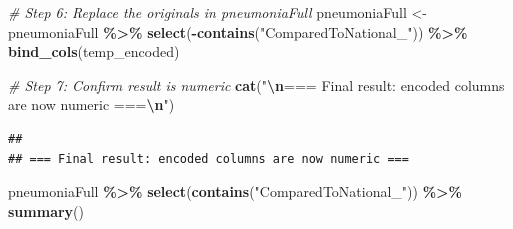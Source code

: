 \documentclass[
]{article}
\newenvironment{Shaded}{\begin{snugshade}}{\end{snugshade}}
\newcommand{\CommentTok}[1]{\textcolor[rgb]{0.56,0.35,0.01}{\textit{#1}}}
\newcommand{\FunctionTok}[1]{\textcolor[rgb]{0.13,0.29,0.53}{\textbf{#1}}}
\newcommand{\NormalTok}[1]{#1}
\newcommand{\OtherTok}[1]{\textcolor[rgb]{0.56,0.35,0.01}{#1}}
\newcommand{\SpecialCharTok}[1]{\textcolor[rgb]{0.81,0.36,0.00}{\textbf{#1}}}
\newcommand{\StringTok}[1]{\textcolor[rgb]{0.31,0.60,0.02}{#1}}
\begin{document}
\begin{Shaded}
\begin{Highlighting}[]
\CommentTok{\# Step 6: Replace the originals in pneumoniaFull}
\NormalTok{pneumoniaFull }\OtherTok{\textless{}{-}}\NormalTok{ pneumoniaFull }\SpecialCharTok{\%\textgreater{}\%}
    \FunctionTok{select}\NormalTok{(}\SpecialCharTok{{-}}\FunctionTok{contains}\NormalTok{(}\StringTok{"ComparedToNational\_"}\NormalTok{)) }\SpecialCharTok{\%\textgreater{}\%}
    \FunctionTok{bind\_cols}\NormalTok{(temp\_encoded)}

\CommentTok{\# Step 7: Confirm result is numeric}
\FunctionTok{cat}\NormalTok{(}\StringTok{"}\SpecialCharTok{\textbackslash{}n}\StringTok{=== Final result: encoded columns are now numeric ===}\SpecialCharTok{\textbackslash{}n}\StringTok{"}\NormalTok{)}
\end{Highlighting}
\end{Shaded}

\begin{verbatim}
## 
## === Final result: encoded columns are now numeric ===
\end{verbatim}

\begin{Shaded}
\begin{Highlighting}[]
\NormalTok{pneumoniaFull }\SpecialCharTok{\%\textgreater{}\%}
    \FunctionTok{select}\NormalTok{(}\FunctionTok{contains}\NormalTok{(}\StringTok{"ComparedToNational\_"}\NormalTok{)) }\SpecialCharTok{\%\textgreater{}\%}
    \FunctionTok{summary}\NormalTok{()}
\end{Highlighting}
\end{Shaded}
\end{document}
